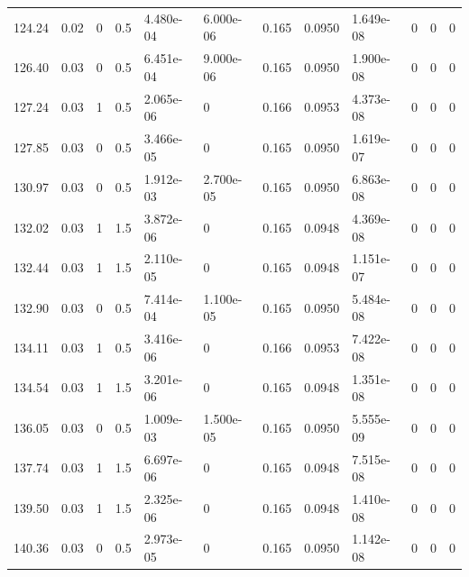 \documentclass[preview]{standalone}
\begin{document}
{{{\begin{tabular}{L{1.2cm}C{1.2cm} C{0.3cm}C{0.5cm} C{1.4cm}C{1.4cm} C{1.4cm}C{1.4cm} C{1.6cm}C{1.6cm} C{1.6cm}C{1.6cm}}
  124.24  &  0.02  & 0     & 0.5 &  4.480e-04  & 6.000e-06  &  0.165&   0.0950& 1.649e-08 & 0   &  0 & 0  \\ 
  126.40  &  0.03  & 0     & 0.5 &  6.451e-04  & 9.000e-06  &  0.165&   0.0950& 1.900e-08 & 0   &  0 & 0  \\ 
  127.24  &  0.03  & 1     & 0.5 &  2.065e-06  & 0  &  0.166&   0.0953& 4.373e-08 & 0   &  0 & 0  \\ 
  127.85  &  0.03  & 0     & 0.5 &  3.466e-05  & 0  &  0.165&   0.0950& 1.619e-07 & 0   &  0 & 0  \\ 
  130.97  &  0.03  & 0     & 0.5 &  1.912e-03  & 2.700e-05  &  0.165&   0.0950& 6.863e-08 & 0   &  0 & 0  \\ 
  132.02  &  0.03  & 1     & 1.5 &  3.872e-06  & 0  &  0.165&   0.0948& 4.369e-08 & 0   &  0 & 0  \\ 
  132.44  &  0.03  & 1     & 1.5 &  2.110e-05  & 0  &  0.165&   0.0948& 1.151e-07 & 0   &  0 & 0  \\ 
  132.90  &  0.03  & 0     & 0.5 &  7.414e-04  & 1.100e-05  &  0.165&   0.0950& 5.484e-08 & 0   &  0 & 0  \\ 
  134.11  &  0.03  & 1     & 0.5 &  3.416e-06  & 0  &  0.166&   0.0953& 7.422e-08 & 0   &  0 & 0  \\ 
  134.54  &  0.03  & 1     & 1.5 &  3.201e-06  & 0  &  0.165&   0.0948& 1.351e-08 & 0   &  0 & 0  \\ 
  136.05  &  0.03  & 0     & 0.5 &  1.009e-03  & 1.500e-05  &  0.165&   0.0950& 5.555e-09 & 0   &  0 & 0  \\ 
  137.74  &  0.03  & 1     & 1.5 &  6.697e-06  & 0  &  0.165&   0.0948& 7.515e-08 & 0   &  0 & 0  \\ 
  139.50  &  0.03  & 1     & 1.5 &  2.325e-06  & 0  &  0.165&   0.0948& 1.410e-08 & 0   &  0 & 0  \\ 
  140.36  &  0.03  & 0     & 0.5 &  2.973e-05  & 0  &  0.165&   0.0950& 1.142e-08 & 0   &  0 & 0  \\ 
\hline 
\end{tabular} 

}}}
\end{document}
